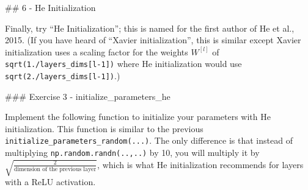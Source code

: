 \documentclass[11pt]{article}
\begin{document}
    \#\# 6 - He Initialization

Finally, try ``He Initialization''; this is named for the first author
of He et al., 2015. (If you have heard of ``Xavier initialization'',
this is similar except Xavier initialization uses a scaling factor for
the weights \(W^{[l]}\) of \texttt{sqrt(1./layers\_dims{[}l-1{]})} where
He initialization would use \texttt{sqrt(2./layers\_dims{[}l-1{]})}.)

\#\#\# Exercise 3 - initialize\_parameters\_he

Implement the following function to initialize your parameters with He
initialization. This function is similar to the previous
\texttt{initialize\_parameters\_random(...)}. The only difference is
that instead of multiplying \texttt{np.random.randn(..,..)} by 10, you
will multiply it by
\(\sqrt{\frac{2}{\text{dimension of the previous layer}}}\), which is
what He initialization recommends for layers with a ReLU activation.
\end{document}
